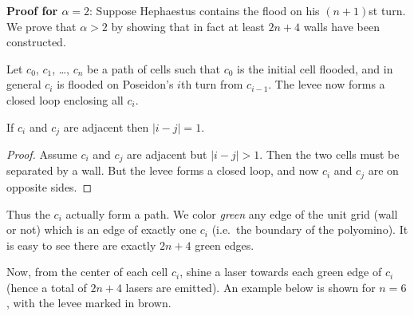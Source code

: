 \documentclass[11pt]{scrartcl}
\begin{document}
\bigskip

\textbf{Proof for $\alpha = 2$}:
Suppose Hephaestus contains the flood
on his $(n+1)$st turn.
We prove that $\alpha > 2$ by showing
that in fact at least $2n+4$ walls have been constructed.

Let $c_0$, $c_1$, \dots, $c_n$ be a path of cells such that
$c_0$ is the initial cell flooded,
and in general $c_i$ is flooded on
Poseidon's $i$th turn from $c_{i-1}$.
The levee now forms a closed loop enclosing all $c_i$.

\begin{claim*}
  If $c_i$ and $c_j$ are adjacent
  then $|i-j|=1$.
\end{claim*}
\begin{proof}
  Assume $c_i$ and $c_j$ are adjacent but $|i-j|>1$.
  Then the two cells must be separated by a wall.
  But the levee forms a closed loop,
  and now $c_i$ and $c_j$ are on opposite sides.
\end{proof}

Thus the $c_i$ actually form a path.
We color \emph{green} any edge of the unit grid (wall or not)
which is an edge of exactly one $c_i$
(i.e.\ the boundary of the polyomino).
It is easy to see there are exactly $2n+4$ green edges.

Now, from the center of each cell $c_i$,
shine a laser towards each green edge of $c_i$
(hence a total of $2n+4$ lasers are emitted).
An example below is shown for $n = 6$,
with the levee marked in brown.
\end{document}
